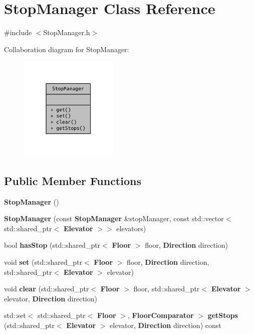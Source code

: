 \section{Stop\+Manager Class Reference}
\label{class_stop_manager}


{\ttfamily \#include $<$Stop\+Manager.\+h$>$}



Collaboration diagram for Stop\+Manager\+:\nopagebreak
\begin{figure}[H]
\begin{center}
\leavevmode
\includegraphics[width=133pt]{class_stop_manager__coll__graph}
\end{center}
\end{figure}
\subsection*{Public Member Functions}
\begin{DoxyCompactItemize}
\item 
{\bf Stop\+Manager} ()
\item 
{\bf Stop\+Manager} (const {\bf Stop\+Manager} \&stop\+Manager, const std\+::vector$<$ std\+::shared\+\_\+ptr$<$ {\bf Elevator} $>$$>$ elevators)
\item 
bool {\bf has\+Stop} (std\+::shared\+\_\+ptr$<$ {\bf Floor} $>$ floor, {\bf Direction} direction)
\item 
void {\bf set} (std\+::shared\+\_\+ptr$<$ {\bf Floor} $>$ floor, {\bf Direction} direction, std\+::shared\+\_\+ptr$<$ {\bf Elevator} $>$ elevator)
\item 
void {\bf clear} (std\+::shared\+\_\+ptr$<$ {\bf Floor} $>$ floor, std\+::shared\+\_\+ptr$<$ {\bf Elevator} $>$ elevator, {\bf Direction} direction)
\item 
std\+::set$<$ std\+::shared\+\_\+ptr$<$ {\bf Floor} $>$, {\bf Floor\+Comparator} $>$ {\bf get\+Stops} (std\+::shared\+\_\+ptr$<$ {\bf Elevator} $>$ elevator, {\bf Direction} direction) const 
\end{DoxyCompactItemize}


